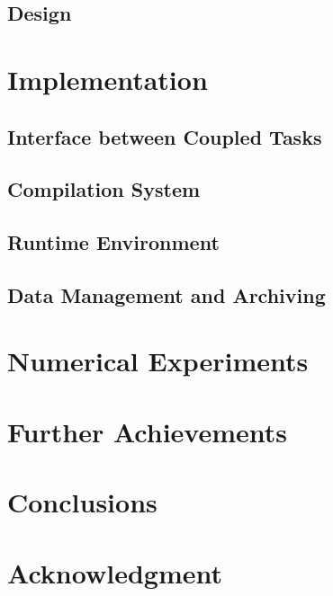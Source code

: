 \documentclass[10pt,conference]{IEEEtran}
\begin{document}
\subsection{Design}

\section{Implementation}
\subsection{Interface between Coupled Tasks}

\subsection{Compilation System}

\subsection{Runtime Environment}

\subsection{Data Management and Archiving}

\section{Numerical Experiments}

\section{Further Achievements}

\section{Conclusions}

\section*{Acknowledgment}

\nocite{ex1,ex2}

%

\end{document}
